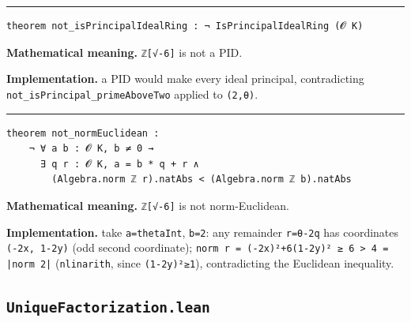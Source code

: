 \documentclass[UTF8,a4paper,11pt,fontset=fandol]{ctexart}
\theoremstyle{definition}
\newcommand{\statementsep}{\par\medskip\hrule\medskip}
\begin{document}
\statementsep
\begin{verbatim}
theorem not_isPrincipalIdealRing : ¬ IsPrincipalIdealRing (𝓞 K)
\end{verbatim}
\noindent\textbf{Mathematical meaning.} \texttt{ℤ[√-6]} is not a PID.\par
\noindent\textbf{Implementation.} a PID would make every ideal principal, contradicting \texttt{not\_\allowbreak{}isPrincipal\_\allowbreak{}primeAboveTwo} applied to \texttt{(2,θ)}.\par
\statementsep
\begin{verbatim}
theorem not_normEuclidean :
    ¬ ∀ a b : 𝓞 K, b ≠ 0 →
      ∃ q r : 𝓞 K, a = b * q + r ∧
        (Algebra.norm ℤ r).natAbs < (Algebra.norm ℤ b).natAbs
\end{verbatim}
\noindent\textbf{Mathematical meaning.} \texttt{ℤ[√-6]} is not norm-Euclidean.\par
\noindent\textbf{Implementation.} take \texttt{a=thetaInt}, \texttt{b=2}: any remainder \texttt{r=θ-2q} has coordinates \texttt{(-2x, 1-2y)} (odd second coordinate); \texttt{norm r = (-2x)²+6(1-2y)² ≥ 6 > 4 = |norm 2|} (\texttt{nlinarith}, since \texttt{(1-2y)²≥1}), contradicting the Euclidean inequality.\par

\subsection{\texttt{UniqueFactorization.lean}}
\end{document}

